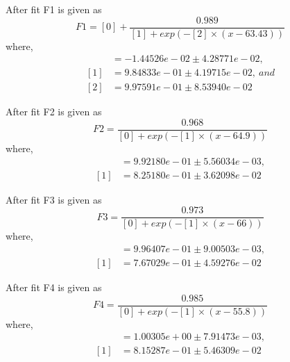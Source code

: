 After fit F1 is given as
\begin{equation}
	F1 = [0] + \frac{0.989}{[1]+exp(-[2]\times(x-63.43))}
\end{equation}
where,
\begin{align*}
[0] &= -1.44526e-02 \pm 4.28771e-02,\\
[1] &= 9.84833e-01 \pm 4.19715e-02,~and \\
[2] &= 9.97591e-01 \pm 8.53940e-02
\end{align*}

After fit F2 is given as
\begin{equation}
	F2 = \frac{0.968}{[0]+exp(-[1]\times(x-64.9))}
\end{equation}
where,
\begin{align*}
[0] &= 9.92180e-01 \pm 5.56034e-03,\\
[1] &= 8.25180e-01 \pm 3.62098e-02
\end{align*} 

After fit F3 is given as
\begin{equation}
	F3 = \frac{0.973}{[0]+exp(-[1]\times(x-66))}
\end{equation}
where,
\begin{align*}
[0] &= 9.96407e-01 \pm 9.00503e-03, \\
[1] &= 7.67029e-01 \pm 4.59276e-02
\end{align*}


After fit F4 is given as
\begin{equation}
	F4 = \frac{0.985}{[0]+exp(-[1]\times(x-55.8))}
\end{equation}
where,
\begin{align*}
[0] &= 1.00305e+00 \pm 7.91473e-03,\\
[1] &= 8.15287e-01 \pm 5.46309e-02
\end{align*}





